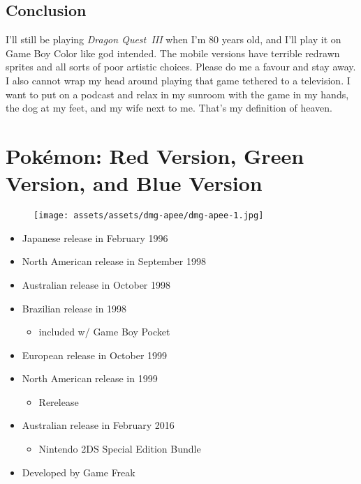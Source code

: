 \documentclass{book}
\begin{document}
\FloatBarrier\section*{Conclusion}
I’ll still be playing \emph{Dragon Quest~III} when I’m 80 years old, and I’ll play it on Game Boy Color like god intended. The mobile versions have terrible redrawn sprites and all sorts of poor artistic choices. Please do me a favour and stay away. I also cannot wrap my head around playing that game tethered to a television. I want to put on a podcast and relax in my sunroom with the game in my hands, the dog at my feet, and my wife next to me. That’s my definition of heaven.\par
\chapter*{Pokémon: Red Version, Green Version, and Blue Version}
\vspace{\baselineskip}\begin{figure}[H]{\texttt{[image: assets/assets/dmg-apee/dmg-apee-1.jpg]}}\end{figure}\vspace{\baselineskip}
\begin{itemize}[left=0pt, nosep]
\item Japanese release in February 1996
\item North American release in September 1998
\item Australian release in October 1998
\item Brazilian release in 1998
\begin{itemize}
\item included w/ Game Boy Pocket
\end{itemize}
\item European release in October 1999
\item North American release in 1999
\begin{itemize}
\item Rerelease
\end{itemize}
\item Australian release in February 2016
\begin{itemize}
\item Nintendo 2DS Special Edition Bundle
\end{itemize}
\item Developed by Game Freak

\end{itemize}
\end{document}
